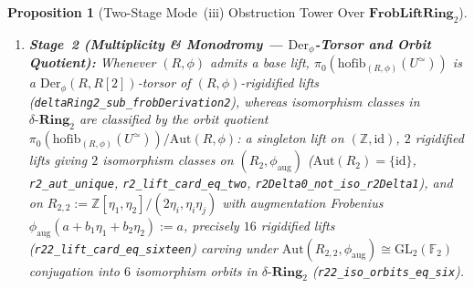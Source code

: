 \documentclass[10pt,twoside,openright]{book}
\theoremstyle{crmplain}
\newtheorem{proposition}[theorem]{Proposition}
\theoremstyle{crmdef}
\theoremstyle{crmremark}
\begin{document}
\begin{proposition}[Two-Stage Mode~(iii) Obstruction Tower Over $\mathbf{FrobLiftRing}_2$]
\begin{enumerate}[label=\textup{(\arabic*)},leftmargin=2.0em]
  \item \textbf{Stage~2 (Multiplicity \& Monodromy — $\mathrm{Der}_\phi$-Torsor and Orbit Quotient):} Whenever $(R, \phi)$ admits a base lift, $\pi_0(\mathrm{hofib}_{(R,\phi)}(U^{\simeq}))$ is a $\mathrm{Der}_\phi(R, R[2])$-torsor of $(R,\phi)$-rigidified lifts (\texttt{deltaRing2\_\allowbreak sub\_\allowbreak frobDerivation2}), whereas isomorphism classes in $\delta\text{-}\mathbf{Ring}_2$ are classified by the orbit quotient $\pi_0(\mathrm{hofib}_{(R,\phi)}(U^{\simeq})) / \mathrm{Aut}(R,\phi)$: a singleton lift on $(\mathbb{Z}, \mathrm{id})$, $2$ rigidified lifts giving $2$ isomorphism classes on $(R_2, \phi_{\mathrm{aug}})$ ($\mathrm{Aut}(R_2) = \{\mathrm{id}\}$, \texttt{r2\_\allowbreak aut\_\allowbreak unique}, \texttt{r2\_\allowbreak lift\_\allowbreak card\_\allowbreak eq\_\allowbreak two}, \texttt{r2Delta0\_\allowbreak not\_\allowbreak iso\_\allowbreak r2Delta1}), and on $R_{2,2} := \mathbb{Z}[\eta_1, \eta_2]/(2\eta_i, \eta_i\eta_j)$ with augmentation Frobenius $\phi_{\mathrm{aug}}(a + b_1\eta_1 + b_2\eta_2) := a$, precisely $16$ rigidified lifts (\texttt{r22\_\allowbreak lift\_\allowbreak card\_\allowbreak eq\_\allowbreak sixteen}) carving under $\mathrm{Aut}(R_{2,2}, \phi_{\mathrm{aug}}) \cong \mathrm{GL}_2(\mathbb{F}_2)$ conjugation into $6$ isomorphism orbits in $\delta\text{-}\mathbf{Ring}_2$ (\texttt{r22\_\allowbreak iso\_\allowbreak orbits\_\allowbreak eq\_\allowbreak six}).
\end{enumerate}
\end{proposition}
\end{document}
